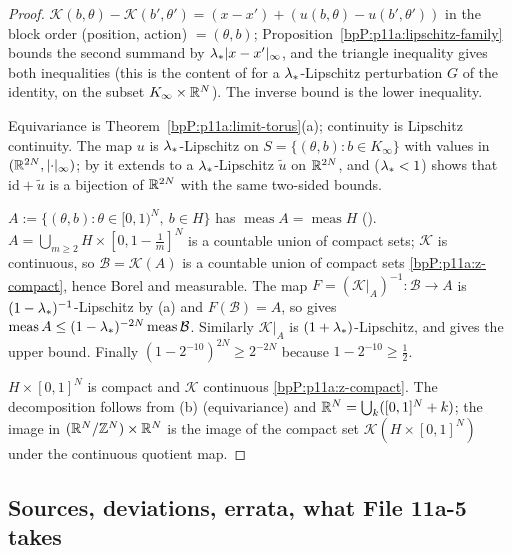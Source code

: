 \begin{proof}
\label{stepP:p11a:eb-bounds} $\mathcal K(b,\theta)-\mathcal K(b',\theta')=(x-x')+(u(b,\theta)-u(b',\theta'))$ in the block order (position, action) $=(\theta,b)$; Proposition~\ref{bpP:p11a:lipschitz-family} bounds the second summand by $\lambda_{*}\lvert x-x'\rvert_\infty$, and the triangle inequality gives both inequalities (this is the content of  for a $\lambda_{*}$-Lipschitz perturbation $G$ of the identity, on the subset $K_\infty\times\mathbb{R}^N$). The inverse bound is the lower inequality.

\label{stepP:p11a:eb-ext} Equivariance is Theorem~\ref{bpP:p11a:limit-torus}(a); continuity is Lipschitz continuity. The map $u$ is $\lambda_{*}$-Lipschitz on $S=\{(\theta,b):b\in K_\infty\}$ with values in $(\mathbb{R}^{2N},\lvert\cdot\rvert_\infty)$; by  it extends to a $\lambda_{*}$-Lipschitz $\widetilde u$ on $\mathbb{R}^{2N}$, and  ($\lambda_{*}<1$) shows that $\mathrm{id}+\widetilde u$ is a bijection of $\mathbb{R}^{2N}$ with the same two-sided bounds.

\label{stepP:p11a:eb-meas} $A:=\{(\theta,b):\theta\in[0,1)^N,\ b\in H\}$ has $\operatorname{meas}A=\operatorname{meas}H$ (). $A=\bigcup_{m\ge2}H\times[0,1-\frac1m]^N$ is a countable union of compact sets; $\mathcal K$ is continuous, so $\mathcal B=\mathcal K(A)$ is a countable union of compact sets \ref{bpP:p11a:z-compact}, hence Borel and measurable. The map $F=(\mathcal K|_A)^{-1}:\mathcal B\to A$ is $(1-\lambda_{*})^{-1}$-Lipschitz by (a) and $F(\mathcal B)=A$, so  gives $\operatorname{meas}A\le(1-\lambda_{*})^{-2N}\operatorname{meas}\mathcal B$. Similarly $\mathcal K|_A$ is $(1+\lambda_{*})$-Lipschitz, and  gives the upper bound. Finally $(1-2^{-10})^{2N}\ge2^{-2N}$ because $1-2^{-10}\ge\frac12$.

\label{stepP:p11a:eb-cpt} $H\times[0,1]^N$ is compact and $\mathcal K$ continuous \ref{bpP:p11a:z-compact}. The decomposition follows from (b) (equivariance) and $\mathbb{R}^N=\bigcup_k([0,1]^N+k)$; the image in $(\mathbb{R}^N/\mathbb{Z}^N)\times\mathbb{R}^N$ is the image of the compact set $\mathcal K(H\times[0,1]^N)$ under the continuous quotient map.
\end{proof}

\subsection{Sources, deviations, errata, what File 11a-5 takes}\label{bpP:p11a:notes4}

